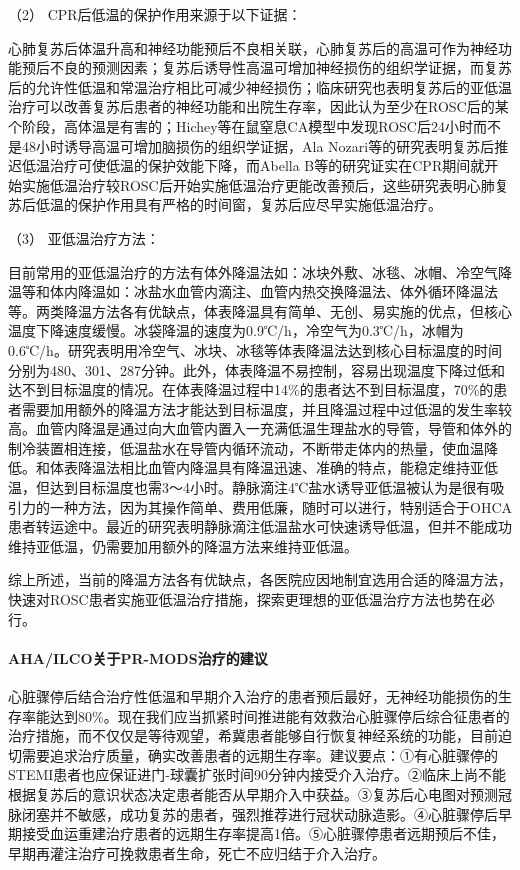 \hypertarget{text00286.htmlux5cux23CHP10-1-7-3-8-2}{}
（2） CPR后低温的保护作用来源于以下证据：

心肺复苏后体温升高和神经功能预后不良相关联，心肺复苏后的高温可作为神经功能预后不良的预测因素；复苏后诱导性高温可增加神经损伤的组织学证据，而复苏后的允许性低温和常温治疗相比可减少神经损伤；临床研究也表明复苏后的亚低温治疗可以改善复苏后患者的神经功能和出院生存率，因此认为至少在ROSC后的某个阶段，高体温是有害的；Hichey等在鼠窒息CA模型中发现ROSC后24小时而不是48小时诱导高温可增加脑损伤的组织学证据，Ala
Nozari等的研究表明复苏后推迟低温治疗可使低温的保护效能下降，而Abella
B等的研究证实在CPR期间就开始实施低温治疗较ROSC后开始实施低温治疗更能改善预后，这些研究表明心肺复苏后低温的保护作用具有严格的时间窗，复苏后应尽早实施低温治疗。

\hypertarget{text00286.htmlux5cux23CHP10-1-7-3-8-3}{}
（3） 亚低温治疗方法：

目前常用的亚低温治疗的方法有体外降温法如：冰块外敷、冰毯、冰帽、冷空气降温等和体内降温如：冰盐水血管内滴注、血管内热交换降温法、体外循环降温法等。两类降温方法各有优缺点，体表降温具有简单、无创、易实施的优点，但核心温度下降速度缓慢。冰袋降温的速度为0.9℃/h，冷空气为0.3℃/h，冰帽为0.6℃/h。研究表明用冷空气、冰块、冰毯等体表降温法达到核心目标温度的时间分别为480、301、287分钟。此外，体表降温不易控制，容易出现温度下降过低和达不到目标温度的情况。在体表降温过程中14\%的患者达不到目标温度，70\%的患者需要加用额外的降温方法才能达到目标温度，并且降温过程中过低温的发生率较高。血管内降温是通过向大血管内置入一充满低温生理盐水的导管，导管和体外的制冷装置相连接，低温盐水在导管内循环流动，不断带走体内的热量，使血温降低。和体表降温法相比血管内降温具有降温迅速、准确的特点，能稳定维持亚低温，但达到目标温度也需3～4小时。静脉滴注4℃盐水诱导亚低温被认为是很有吸引力的一种方法，因为其操作简单、费用低廉，随时可以进行，特别适合于OHCA患者转运途中。最近的研究表明静脉滴注低温盐水可快速诱导低温，但并不能成功维持亚低温，仍需要加用额外的降温方法来维持亚低温。

综上所述，当前的降温方法各有优缺点，各医院应因地制宜选用合适的降温方法，快速对ROSC患者实施亚低温治疗措施，探索更理想的亚低温治疗方法也势在必行。

\paragraph{AHA/ILCO关于PR-MODS治疗的建议}

心脏骤停后结合治疗性低温和早期介入治疗的患者预后最好，无神经功能损伤的生存率能达到80\%。现在我们应当抓紧时间推进能有效救治心脏骤停后综合征患者的治疗措施，而不仅仅是等待观望，希冀患者能够自行恢复神经系统的功能，目前迫切需要追求治疗质量，确实改善患者的远期生存率。建议要点：①有心脏骤停的STEMI患者也应保证进门-球囊扩张时间90分钟内接受介入治疗。②临床上尚不能根据复苏后的意识状态决定患者能否从早期介入中获益。③复苏后心电图对预测冠脉闭塞并不敏感，成功复苏的患者，强烈推荐进行冠状动脉造影。④心脏骤停后早期接受血运重建治疗患者的远期生存率提高1倍。⑤心脏骤停患者远期预后不佳，早期再灌注治疗可挽救患者生命，死亡不应归结于介入治疗。


